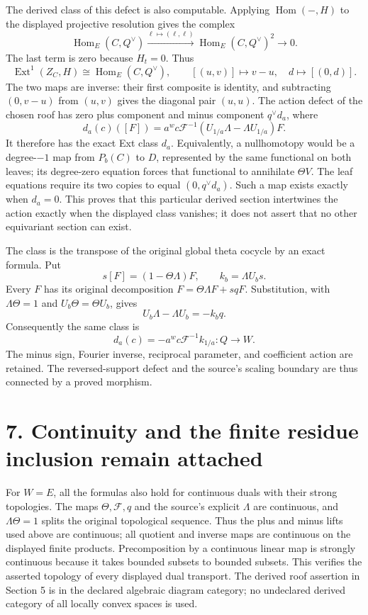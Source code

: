 \documentclass[
  11pt,
]{article}
\begin{document}
The derived class of this defect is also computable. Applying
\(\operatorname{Hom}(-,H)\) to the displayed projective resolution gives
the complex \[
\operatorname{Hom}_E(C,Q^\vee)
\xrightarrow{\ell\mapsto(\ell,\ell)}
\operatorname{Hom}_E(C,Q^\vee)^2
\longrightarrow0.
\] The last term is zero because \(H_t=0\). Thus \[
\operatorname{Ext}^1(Z_C,H)
\cong\operatorname{Hom}_E(C,Q^\vee),
\qquad[(u,v)]\longmapsto v-u,
\quad
d\longmapsto[(0,d)].
\] The two maps are inverse: their first composite is identity, and
subtracting \((0,v-u)\) from \((u,v)\) gives the diagonal pair
\((u,u)\). The action defect of the chosen roof has zero plus component
and minus component \(q^\vee d_a\), where \[
d_a(c)([F])=
a^w c\mathcal F^{-1}
(U_{1/a}\Lambda-\Lambda U_{1/a})F.
\] It therefore has the exact Ext class \(d_a\). Equivalently, a
nullhomotopy would be a degree-\(-1\) map from \(P_b(C)\) to \(D\),
represented by the same functional on both leaves; its degree-zero
equation forces that functional to annihilate \(\Theta V\). The leaf
equations require its two copies to equal \((0,q^\vee d_a)\). Such a map
exists exactly when \(d_a=0\). This proves that this particular derived
section intertwines the action exactly when the displayed class
vanishes; it does not assert that no other equivariant section can
exist.

The class is the transpose of the original global theta cocycle by an
exact formula. Put \[
s[F]=(1-\Theta\Lambda)F,\qquad k_b=\Lambda U_b s.
\] Every \(F\) has its original decomposition
\(F=\Theta\Lambda F+s qF\). Substitution, with \(\Lambda\Theta=1\) and
\(U_b\Theta=\Theta U_b\), gives \[
U_b\Lambda-\Lambda U_b=-k_b q.
\] Consequently the same class is \[
\boxed{d_a(c)=-a^w c\mathcal F^{-1}k_{1/a}:Q\longrightarrow W.}
\] The minus sign, Fourier inverse, reciprocal parameter, and
coefficient action are retained. The reversed-support defect and the
source's scaling boundary are thus connected by a proved morphism.

\section{7. Continuity and the finite residue inclusion remain
attached}\label{continuity-and-the-finite-residue-inclusion-remain-attached}

For \(W=E\), all the formulas also hold for continuous duals with their
strong topologies. The maps \(\Theta,\mathcal F,q\) and the source's
explicit \(\Lambda\) are continuous, and \(\Lambda\Theta=1\) splits the
original topological sequence. Thus the plus and minus lifts used above
are continuous; all quotient and inverse maps are continuous on the
displayed finite products. Precomposition by a continuous linear map is
strongly continuous because it takes bounded subsets to bounded subsets.
This verifies the asserted topology of every displayed dual transport.
The derived roof assertion in Section 5 is in the declared algebraic
diagram category; no undeclared derived category of all locally convex
spaces is used.
\end{document}
